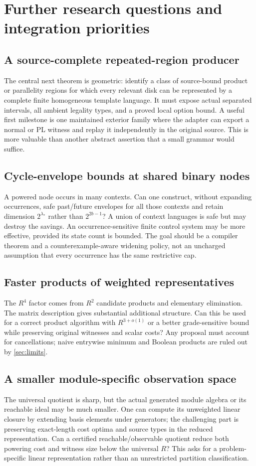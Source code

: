 \documentclass[11pt,a4paper]{article}
\theoremstyle{definition}
\begin{document}
\section{Further research questions and integration priorities}\label{sec:future}

\subsection{A source-complete repeated-region producer}
The central next theorem is geometric: identify a class of source-bound product or parallelity regions for which every relevant disk can be represented by a complete finite homogeneous template language. It must expose actual separated intervals, all ambient legality types, and a proved local option bound. A useful first milestone is one maintained exterior family where the adapter can export a normal or PL witness and replay it independently in the original source. This is more valuable than another abstract assertion that a small grammar would suffice.

\subsection{Cycle-envelope bounds at shared binary nodes}
A powered node occurs in many contexts. Can one construct, without expanding occurrences, safe past/future envelopes for all those contexts and retain dimension $2^{\lambda_*}$ rather than $2^{2b-1}$? A union of context languages is safe but may destroy the savings. An occurrence-sensitive finite control system may be more effective, provided its state count is bounded. The goal should be a compiler theorem and a counterexample-aware widening policy, not an uncharged assumption that every occurrence has the same restrictive cap.

\subsection{Faster products of weighted representatives}
The $R^4$ factor comes from $R^2$ candidate products and elementary elimination. The matrix description gives substantial additional structure. Can this be used for a correct product algorithm with $R^{3+o(1)}$ or a better grade-sensitive bound while preserving original witnesses and scalar costs? Any proposal must account for cancellations; naive entrywise minimum and Boolean products are ruled out by \cref{sec:limits}.

\subsection{A smaller module-specific observation space}
The universal quotient is sharp, but the actual generated module algebra or its reachable ideal may be much smaller. One can compute its unweighted linear closure by extending basis elements under generators; the challenging part is preserving exact-length cost optima and source types in the reduced representation. Can a certified reachable/observable quotient reduce both powering cost and witness size below the universal $R$? This asks for a problem-specific linear representation rather than an unrestricted partition classification.
\end{document}
